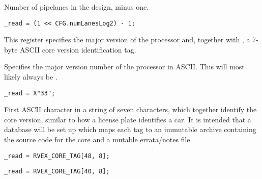 Number of pipelanes in the design, minus one.

\reset{****}
\implementation{}
\begin{lstlisting}
_read = (1 << CFG.numLanesLog2) - 1;
\end{lstlisting}


This register specifies the major version of the processor and, together with
, a 7-byte ASCII core version identification tag.

Specifies the major version number of the \rvex{} processor in ASCII. This will
most likely always be .

\implementation{}
\begin{lstlisting}
_read = X"33";
\end{lstlisting}

First ASCII character in a string of seven characters, which together identify 
the core version, similar to how a license plate identifies a car. It is 
intended that a database will be set up which maps each tag to an immutable 
archive containing the source code for the core and a mutable errata/notes file.

\implementation{}
\begin{lstlisting}
_read = RVEX_CORE_TAG[48, 8];
\end{lstlisting}

\implementation{}
\begin{lstlisting}
_read = RVEX_CORE_TAG[40, 8];
\end{lstlisting}

